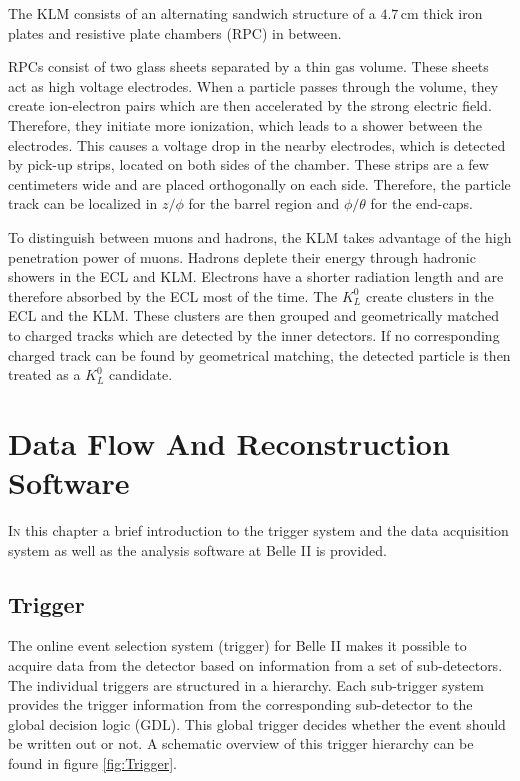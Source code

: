 \documentclass[a4paper,11pt,twosided,final,german,openbib,pdftex,listof=totoc,bibliography=totoc]{scrbook}
\begin{document}
The KLM consists of an alternating sandwich structure of a $4.7\,\textrm{cm}$ thick iron plates and resistive plate chambers (RPC) in between.

RPCs consist of two glass sheets separated by a thin gas volume. These sheets act as high voltage electrodes. When a particle passes through the volume, they create ion-electron pairs which are then accelerated by the strong electric field. Therefore, they initiate more ionization, which leads to a shower between the electrodes. This causes a voltage drop in the nearby electrodes, which is detected by pick-up strips, located on both sides of the chamber. These strips are a few centimeters wide and are placed orthogonally on each side. Therefore, the particle track can be localized in $z/\phi$ for the barrel region and $\phi/\theta$ for the end-caps.

To distinguish between muons and hadrons, the KLM takes advantage of the high penetration power of muons. Hadrons deplete their energy through hadronic showers in the ECL and KLM. Electrons have a shorter radiation length and are therefore absorbed by the ECL most of the time. The $K_L^0$ create clusters in the ECL and the KLM. These clusters are then grouped and geometrically matched to charged tracks which are detected by the inner detectors. If no corresponding charged track can be found by geometrical matching, the detected particle is then treated as a $K_L^0$ candidate.\cite{B2TR}\cite{KLMS}



\chapter{Data Flow And Reconstruction Software}
\label{sec:TDAS}


\lettrine{I}{n} this chapter a brief introduction to the trigger system and the data acquisition system as well as the analysis software at Belle II is provided.


\section{Trigger}

The online event selection system (trigger) for Belle II makes it possible to acquire data from the detector based on information from a set of sub-detectors. The individual triggers are structured in a hierarchy. Each sub-trigger system provides the trigger information from the corresponding sub-detector to the global decision logic (GDL). This global trigger decides whether the event should be written out or not. \cite{B2TR} A schematic overview of this trigger hierarchy can be found in figure \ref{fig:Trigger}.
\end{document}
